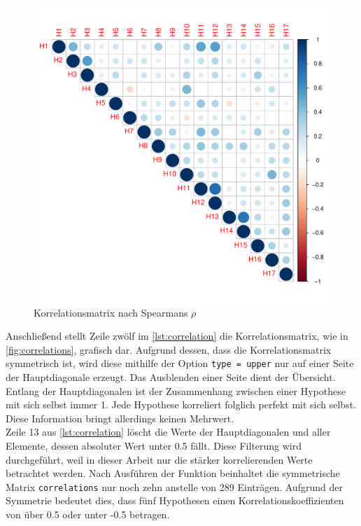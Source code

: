 \begin{figure}[H]
\centering
\includegraphics[width=0.65\columnwidth]{figures/plots/correlation.pdf}
\caption{\label{fig:correlations} Korrelationsmatrix nach Spearmans $\rho$}
\end{figure}

Anschließend stellt Zeile zwölf im \autoref{lst:correlation} die Korrelationsmatrix, wie in \autoref{fig:correlations}, grafisch dar. Aufgrund dessen, dass die Korrelationsmatrix symmetrisch ist, wird diese mithilfe der Option \texttt{type = upper} nur auf einer Seite der Hauptdiagonale erzeugt.
Das Ausblenden einer Seite dient der Übersicht. Entlang der Hauptdiagonalen ist der Zusammenhang zwischen einer Hypothese mit sich selbst immer 1. Jede Hypothese korreliert folglich perfekt mit sich selbst. Diese Information bringt allerdings keinen Mehrwert.\\

Zeile 13 aus \autoref{lst:correlation} löscht die Werte der Hauptdiagonalen und aller Elemente, dessen absoluter Wert unter 0.5 fällt. Diese Filterung wird durchgeführt, weil in dieser Arbeit nur die stärker korrelierenden Werte betrachtet werden\cite{cohen-power}. Nach Ausführen der Funktion beinhaltet die symmetrische Matrix \texttt{correlations} nur noch zehn anstelle von 289 Einträgen. Aufgrund der Symmetrie bedeutet dies, dass fünf Hypothesen einen Korrelationskoeffizienten von über 0.5 oder unter -0.5 betragen. \\

